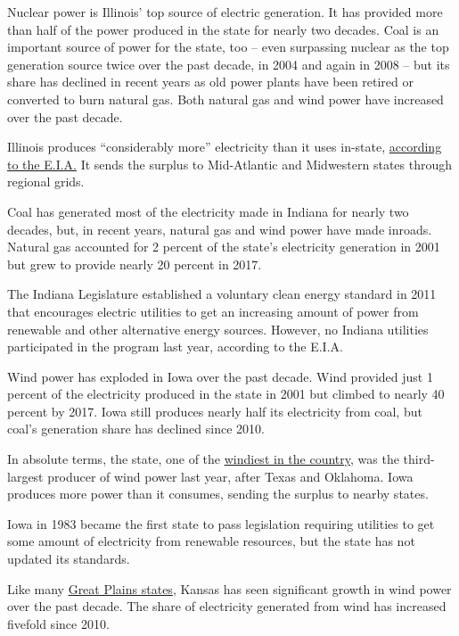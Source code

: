Nuclear power is Illinois' top source of electric generation. It has
provided more than half of the power produced in the state for nearly
two decades. Coal is an important source of power for the state, too --
even surpassing nuclear as the top generation source twice over the past
decade, in 2004 and again in 2008 -- but its share has declined in
recent years as old power plants have been retired or converted to burn
natural gas. Both natural gas and wind power have increased over the
past decade.

Illinois produces ``considerably more'' electricity than it uses
in-state, \href{https://www.eia.gov/state/analysis.php?sid=IL}{according
to the E.I.A.} It sends the surplus to Mid-Atlantic and Midwestern
states through regional grids.

Coal has generated most of the electricity made in Indiana for nearly
two decades, but, in recent years, natural gas and wind power have made
inroads. Natural gas accounted for 2 percent of the state's electricity
generation in 2001 but grew to provide nearly 20 percent in 2017.

The Indiana Legislature established a voluntary clean energy standard in
2011 that encourages electric utilities to get an increasing amount of
power from renewable and other alternative energy sources. However, no
Indiana utilities participated in the program last year, according to
the E.I.A.

Wind power has exploded in Iowa over the past decade. Wind provided just
1 percent of the electricity produced in the state in 2001 but climbed
to nearly 40 percent by 2017. Iowa still produces nearly half its
electricity from coal, but coal's generation share has declined since
2010.

In absolute terms, the state, one of the
\href{https://windexchange.energy.gov/maps-data/319}{windiest in the
country}, was the third-largest producer of wind power last year, after
Texas and Oklahoma. Iowa produces more power than it consumes, sending
the surplus to nearby states.

Iowa in 1983 became the first state to pass legislation requiring
utilities to get some amount of electricity from renewable resources,
but the state has not updated its standards.

Like many \href{https://windexchange.energy.gov/maps-data/319}{Great
Plains states}, Kansas has seen significant growth in wind power over
the past decade. The share of electricity generated from wind has
increased fivefold since 2010.

